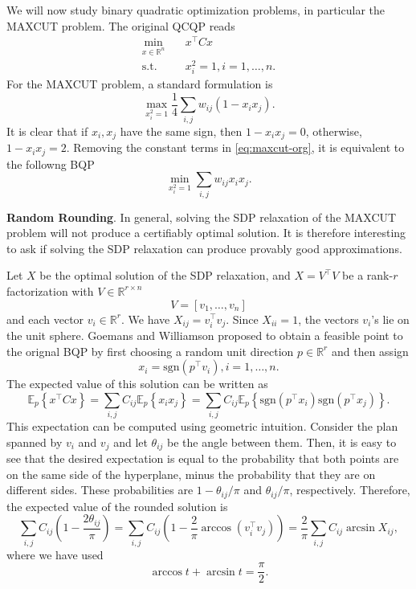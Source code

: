 \documentclass[
]{book}
\theoremstyle{definition}
\theoremstyle{definition}
\theoremstyle{definition}
\theoremstyle{definition}
\theoremstyle{remark}
\begin{document}
We will now study binary quadratic optimization problems, in particular the MAXCUT problem. The original QCQP reads
\begin{equation}
\begin{split}
\min_{x \in \mathbb{R}^{n}} & \quad x^\top C x \\
\mathrm{s.t.}& \quad x_i^2 = 1, i=1,\dots,n.
\end{split}
\label{eq:bqp}
\end{equation}
For the MAXCUT problem, a standard formulation is
\begin{equation}
\max_{x_i^2 = 1}  \frac{1}{4} \sum_{i,j} w_{ij} (1 - x_i x_j).
\label{eq:maxcut-org}
\end{equation}
It is clear that if \(x_i, x_j\) have the same sign, then \(1- x_i x_j = 0\), otherwise, \(1- x_i x_j = 2\). Removing the constant terms in \eqref{eq:maxcut-org}, it is equivalent to the followng BQP
\begin{equation}
\min_{x_i^2 = 1}  \sum_{i,j} w_{ij} x_i x_j.
\label{eq:maxcut-bqp}
\end{equation}

\textbf{Random Rounding}. In general, solving the SDP relaxation of the MAXCUT problem will not produce a certifiably optimal solution. It is therefore interesting to ask if solving the SDP relaxation can produce provably good approximations.

Let \(X\) be the optimal solution of the SDP relaxation, and \(X = V^\top V\) be a rank-\(r\) factorization with \(V \in \mathbb{R}^{r \times n}\)
\[
V = [v_1,\dots,v_n]
\]
and each vector \(v_i \in \mathbb{R}^{r}\). We have \(X_{ij} = v_i^\top v_j\). Since \(X_{ii} = 1\), the vectors \(v_i\)'s lie on the unit sphere. Goemans and Williamson \citep{goemans95jacm-improved} proposed to obtain a feasible point to the orignal BQP by first choosing a random unit direction \(p \in \mathbb{R}^{r}\) and then assign
\[
x_i = \mathrm{sgn}(p^\top v_i), i=1,\dots,n.
\]
The expected value of this solution can be written as
\[
\mathbb{E}_p  \left\{ x^\top C x \right\}  = \sum_{i,j} C_{ij} \mathbb{E}_p  \left\{ x_i x_j \right\}  = \sum_{i,j} C_{ij} \mathbb{E}_p  \left\{ \mathrm{sgn}(p^\top x_i) \mathrm{sgn}(p^\top x_j) \right\} .
\]
This expectation can be computed using geometric intuition. Consider the plan spanned by \(v_i\) and \(v_j\) and let \(\theta_{ij}\) be the angle between them. Then, it is easy to see that the desired expectation is equal to the probability that both points are on the same side of the hyperplane, minus the probability that they are on different sides. These probabilities are \(1- \theta_{ij} / \pi\) and \(\theta_{ij} / \pi\), respectively. Therefore, the expected value of the rounded solution is
\[
\sum_{i,j} C_{ij} \left( 1- \frac{2\theta_{ij}}{\pi} \right) = \sum_{i,j} C_{ij} \left( 1- \frac{2}{\pi} \arccos (v_i^\top v_j)  \right) = \frac{2}{\pi} \sum_{i,j} C_{ij} \arcsin X_{ij},
\]
where we have used
\[
\arccos t + \arcsin t = \frac{\pi}{2}.
\]
\end{document}
